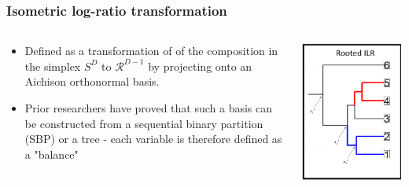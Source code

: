 \documentclass{beamer}
\begin{document}
\begin{frame}
    \frametitle{Isometric log-ratio transformation}
    \begin{columns}
        \begin{column}{0.5\textwidth}
            \begin{itemize}
                \item Defined as a transformation of of the composition in the simplex $S^D$ to $\mathcal{R}^{D-1}$ by projecting onto an Aichison orthonormal basis. 
                \item Prior researchers have proved \cite{egozcue2003} that such a basis can be constructed from a sequential binary partition (SBP) or a tree - each variable is therefore defined as a "balance" \cite{morton2017a}
            \end{itemize}
        \end{column}
        \begin{column}{0.5\textwidth}
            \begin{center}
                \includegraphics[scale=0.5]{phylogeny_demonstration.png}
            \end{center}
        \end{column}
    \end{columns}
\end{frame}
\end{document}
